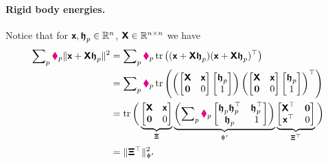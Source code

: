 \paragraph*{Rigid body energies.}
Notice that for $\boldsymbol{\mathsf{x}}, \boldsymbol{\mathfrak{h}}_{p} \in \mathbb{R}^{n}$, $\boldsymbol{\mathsf{X}} \in \mathbb{R}^{n\times n}$ we have
\begin{align}
 \sumParticles \particleMass{\PidxI} \norm{\protox + \protoX \particleBodyPos{\PidxI}}^2
 &= \sumParticles \particleMass{\PidxI} \tr\big( (\protox + \protoX \particleBodyPos{\PidxI})(\protox + \protoX \particleBodyPos{\PidxI})^\top \big)
\nonumber\\
 &= \sumParticles \particleMass{\PidxI} \tr\left( \left(\begin{bmatrix} \protoX & \protox \\ \mat{0} & 0 \end{bmatrix}\begin{bmatrix} \particleBodyPos{\PidxI}\\ 1 \end{bmatrix} \right) \left(\begin{bmatrix} \protoX & \protox \\ \mat{0} & 0 \end{bmatrix}\begin{bmatrix} \particleBodyPos{\PidxI}\\ 1 \end{bmatrix} \right)^\top \right)
\nonumber\\
 &= \tr\bigg( \underbrace{\begin{bmatrix} \protoX & \protox \\ \mat{0} & 0 \end{bmatrix}}_{\protoXi} \underbrace{\left( \sumParticles \particleMass{\PidxI} \begin{bmatrix} \particleBodyPos{\PidxI} \particleBodyPos{\PidxI}^\top & \particleBodyPos{\PidxI}^\top \\ \particleBodyPos{\PidxI} & 1 \end{bmatrix} \right)}_{\bodyInertiaMatp{}{}} \underbrace{\begin{bmatrix} \protoX^\top & \mat{0} \\ \protox^\top & 0 \end{bmatrix}}_{\protoXi^\top} \bigg)
\nonumber\\
 &= \norm[\bodyInertiaMatp{}{}]{\protoXi^\top}^2
\end{align}
